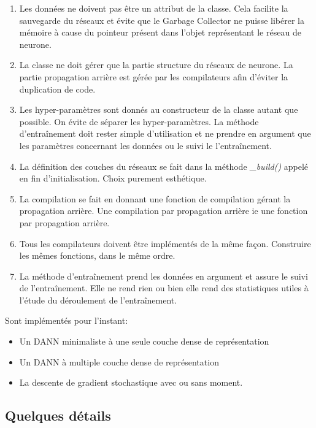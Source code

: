 \begin{enumerate}
	\item Les données ne doivent pas être un attribut de la classe. Cela 
	facilite la sauvegarde du réseaux et évite que le Garbage Collector ne puisse 
	libérer la mémoire à cause du pointeur présent dans l'objet représentant 
	le réseau de neurone.
	\item La classe ne doit gérer que la partie structure du réseaux de neurone.
	La partie propagation arrière est gérée par les compilateurs afin d'éviter 
	la duplication de code.
	\item Les hyper-paramètres sont donnés au constructeur de la classe autant
	que possible. On évite de séparer les hyper-paramètres. La méthode 
	d'entraînement doit rester simple d'utilisation et ne prendre en argument 
	que les paramètres concernant les données ou le suivi le l'entraînement.
	\item La définition des couches du réseaux se fait dans la méthode 
	\emph{\_build()} appelé en fin d'initialisation. Choix purement esthétique.
	\item La compilation se fait en donnant une fonction de compilation
	gérant la propagation arrière. Une compilation par propagation arrière ie
	une fonction par propagation arrière.
	\item Tous les compilateurs doivent être implémentés de la même façon. 
	Construire les mêmes fonctions, dans le même ordre.
	\item La méthode d'entraînement prend les données en argument et assure le
	suivi de l'entraînement. Elle ne rend rien ou bien elle rend des statistiques
	utiles à l'étude du déroulement de l'entraînement.
\end{enumerate}

Sont implémentés pour l'instant:
\begin{itemize}
	\item Un DANN minimaliste à une seule couche dense de représentation
	\item Un DANN à multiple couche dense de représentation
	\item La descente de gradient stochastique avec ou sans moment.
\end{itemize}


\subsection{Quelques détails} %
\label{sub:quelques_details}

